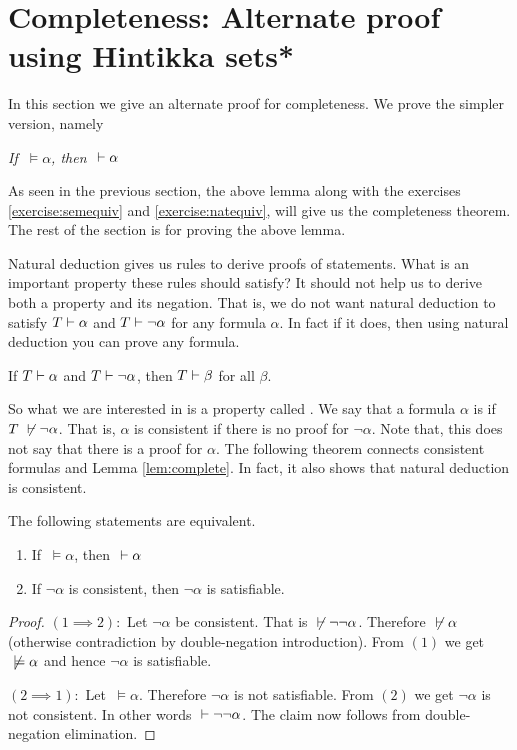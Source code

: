 \section[Completeness: Hintikka*]{Completeness: Alternate proof using Hintikka sets*}
In this section we give an alternate proof for completeness. We prove the simpler version, namely

 \emph{If \true $~\models \alpha$, then \true $~\vdash \alpha$}

As seen in the previous section, the above lemma along with the exercises \ref{exercise:semequiv} and \ref{exercise:natequiv}, will give us the completeness theorem. The rest of the section is for proving the above lemma.

Natural deduction gives us rules to derive proofs of statements. What is an important property these rules should satisfy? It should not help us to derive both a property and its negation. That is, we do not want natural deduction to satisfy $T \vdash \alpha$ and $T \vdash \neg \alpha$ for any formula $\alpha$. In fact if it does, then using natural deduction you can prove any formula. 
\begin{exercise}
If $T \vdash \alpha$ and $T \vdash \neg \alpha$, then $T \vdash \beta$ for all $\beta$.
\end{exercise}
So what we are interested in is a property called . We say that a formula $\alpha$ is  if $T ~\not \vdash \neg \alpha$. That is, $\alpha$ is consistent if there is no proof for $\neg \alpha$. Note that, this does not say that there is a proof for $\alpha$. The following theorem connects consistent formulas and Lemma \ref{lem:complete}. In fact, it also shows that natural deduction is consistent.
\begin{claim}
The following statements are equivalent.
\begin{enumerate}
\item If \true $~\models \alpha$, then \true $~\vdash \alpha$
\item If $\neg \alpha$ is consistent, then $\neg \alpha$ is satisfiable.
\end{enumerate}
\end{claim}
\begin{proof}
$(1 \implies 2):$ Let $\neg \alpha$ be consistent. That is  \true $~\not \vdash \neg \neg \alpha$.
Therefore \true $~\not \vdash \alpha$ (otherwise contradiction by double-negation introduction). From $(1)$ we get \true $~ \not \models \alpha$ and hence $\neg \alpha$ is satisfiable.

\noindent $(2 \implies 1):$ Let \true $~\models \alpha$. Therefore $\neg \alpha$ is not satisfiable. From $(2)$ we get $\neg \alpha$ is not consistent. In other words \true $~\vdash \neg \neg \alpha$. The claim now follows from double-negation elimination.
\end{proof}
